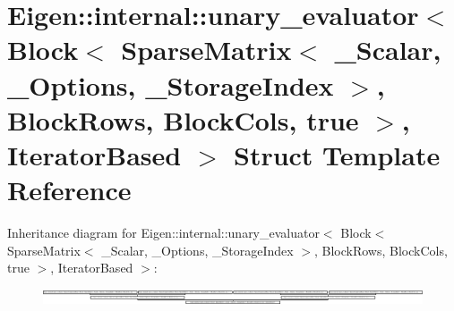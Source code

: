 \hypertarget{struct_eigen_1_1internal_1_1unary__evaluator_3_01_block_3_01_sparse_matrix_3_01___scalar_00_01__bc162881393553b921ff4fd46550ce3d}{}\section{Eigen\+:\+:internal\+:\+:unary\+\_\+evaluator$<$ Block$<$ Sparse\+Matrix$<$ \+\_\+\+Scalar, \+\_\+\+Options, \+\_\+\+Storage\+Index $>$, Block\+Rows, Block\+Cols, true $>$, Iterator\+Based $>$ Struct Template Reference}
\label{struct_eigen_1_1internal_1_1unary__evaluator_3_01_block_3_01_sparse_matrix_3_01___scalar_00_01__bc162881393553b921ff4fd46550ce3d}
Inheritance diagram for Eigen\+:\+:internal\+:\+:unary\+\_\+evaluator$<$ Block$<$ Sparse\+Matrix$<$ \+\_\+\+Scalar, \+\_\+\+Options, \+\_\+\+Storage\+Index $>$, Block\+Rows, Block\+Cols, true $>$, Iterator\+Based $>$\+:\begin{figure}[H]
\begin{center}
\leavevmode
\includegraphics[height=0.467706cm]{struct_eigen_1_1internal_1_1unary__evaluator_3_01_block_3_01_sparse_matrix_3_01___scalar_00_01__bc162881393553b921ff4fd46550ce3d}
\end{center}
\end{figure}
